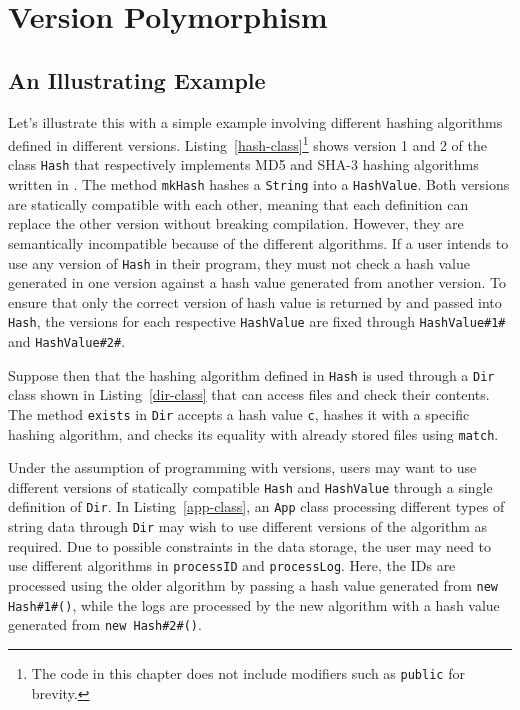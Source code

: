 \section{Version Polymorphism}


\subsection{An Illustrating Example}

Let's illustrate this with a simple example involving different hashing algorithms defined in different versions. 
Listing~\ref{hash-class}\footnote{The code in this chapter does not include modifiers such as \texttt{public} for brevity.} 
shows version 1 and 2 of the class \texttt{Hash} that respectively implements MD5 and SHA-3 hashing algorithms written in \lang{}. 
The method \texttt{mkHash} hashes a \texttt{String} into a \texttt{HashValue}. Both versions are statically compatible with 
each other, meaning that each definition can replace the other version without breaking compilation. However, they are semantically 
incompatible because of the different algorithms. If a user intends to use any version of \texttt{Hash} in their program, 
they must not check a hash value generated in one version against a hash value generated from another version. 
To ensure that only the correct version of hash value is returned by and passed into \texttt{Hash}, 
the versions for each respective \texttt{HashValue} are fixed through \texttt{HashValue\#1\#} and \texttt{HashValue\#2\#}.

Suppose then that the hashing algorithm defined in \texttt{Hash} is used through a \texttt{Dir} class shown in Listing~\ref{dir-class} 
that can access files and check their contents. The method \texttt{exists} in \texttt{Dir} accepts a hash value \texttt{c}, hashes 
it with a specific hashing algorithm, and checks its equality with already stored files using \texttt{match}.

Under the assumption of programming with versions, users may want to use different versions of statically compatible \texttt{Hash} 
and \texttt{HashValue} through a single definition of \texttt{Dir}. In Listing~\ref{app-class}, an \texttt{App} class processing 
different types of string data through \texttt{Dir} may wish to use different versions of the algorithm as required. Due to possible 
constraints in the data storage, the user may need to use different algorithms in \texttt{processID} and \texttt{processLog}. Here, 
the IDs are processed using the older algorithm by passing a hash value generated from \texttt{new Hash\#1\#()}, while the logs are 
processed by the new algorithm with a hash value generated from \texttt{new Hash\#2\#()}.

